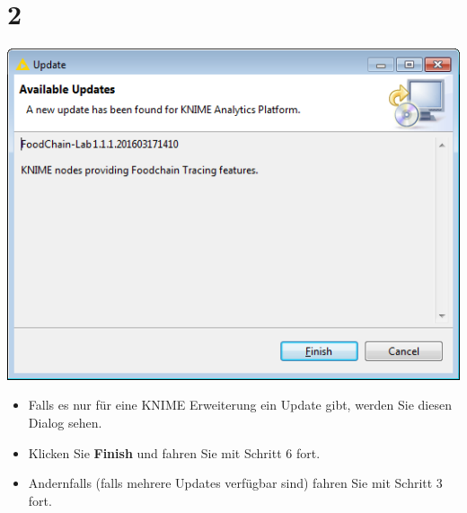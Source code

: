 \documentclass{beamer}
\begin{document}
\section{2}
\begin{frame}
	\begin{center}
  		\includegraphics[height=0.6\textheight]{2.png}
	\end{center}
	\begin{itemize}
		\item Falls es nur für eine KNIME Erweiterung ein Update gibt, werden Sie diesen Dialog sehen.
		\item Klicken Sie \textbf{Finish} und fahren Sie mit Schritt 6 fort.
		\item Andernfalls (falls mehrere Updates verfügbar sind) fahren Sie mit Schritt 3 fort.
	\end{itemize}
\end{frame}
\end{document}
